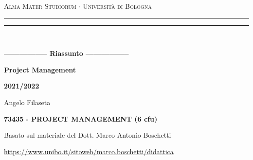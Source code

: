 \begin{titlepage}
    \begin{center}
        {{\Large{\textsc{Alma Mater Studiorum $\cdot$ Università di Bologna}}}}
        \rule[0.1cm]{15.8cm}{0.1mm}
        \rule[0.5cm]{15.8cm}{0.6mm}
        \\
        \vspace{3mm}
    \end{center}
    \vspace{2mm}
    \begin{center}
        {\LARGE{\bf{----------------- Riassunto -----------------}}}
        \vspace{5mm} \par \noindent
        {\Huge{\bf{Project Management}}}
        \vspace{10mm} \par \noindent
        {\LARGE \bf{2021/2022}}
        \vspace{15mm} \par \noindent
        {\Large Angelo Filaseta}
        \vspace{15mm} \par \noindent
        {\LARGE \bf{73435 - PROJECT MANAGEMENT (6 cfu)}}
        \vspace{8mm} \par \noindent
        {\Large Basato sul materiale del Dott. Marco Antonio Boschetti}
        \vspace{5mm} \par \noindent
        {\small \url{https://www.unibo.it/sitoweb/marco.boschetti/didattica}}
	\end{center}
    \hfill
    \vspace{40mm}
\end{titlepage}
